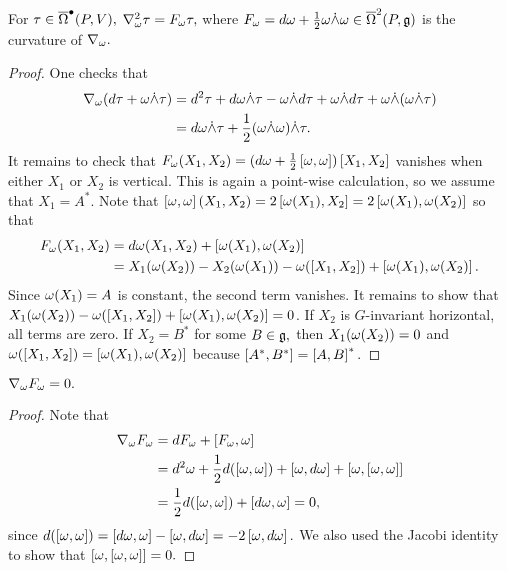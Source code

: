 \begin{prop}
 \label{JB:4.10}
For $\tau \in \overline{\Omega}^{\bullet}(P, V),$ $\nabla^{2}_{\omega}\tau=F_{\omega}\tau,$ where $F_{\omega}=d\omega + \frac{1}{2}\omega \dot{\wedge} \omega \in
\overline{\Omega}^{2}(P, \mathfrak{g})$ is the curvature of $\nabla_{\omega}.$
\end{prop}
\begin{proof}
 One checks that
\begin{align*}
 \nabla_{\omega}(d\tau+\omega \dot{\wedge} \tau)&=d^{2}\tau + d\omega \dot{\wedge} \tau - \omega \dot{\wedge} d\tau + \omega \dot{\wedge} d\tau+ \omega \dot{\wedge} (\omega \dot{\wedge}
\tau)\\
&= d\omega \dot{\wedge} \tau + \frac{1}{2}(\omega \dot{\wedge} \omega) \dot{\wedge} \tau. 
\end{align*}
It remains to check that $F_{\omega}(X_{1},X_{2})= (d\omega+\frac{1}{2}\left[\omega,\omega\right])\left[X_{1},X_{2}\right]$ vanishes when
either $X_{1}$ or $X_{2}$ is vertical. This is again a point-wise calculation, so we assume that $X_{1}=A^{*}.$ Note
that $\left[\omega,\omega\right](X_{1},X_{2})=2\left[\omega(X_{1}),X_{2}\right]=2\left[\omega(X_{1}),\omega(X_{2})\right]$ so that
\begin{align*}
 F_{\omega}(X_{1},X_{2}) &= d\omega(X_{1}, X_{2})+ \left[\omega(X_{1}),\omega(X_{2})\right] \\
&= X_{1}(\omega(X_{2}))-X_{2}(\omega(X_{1}))-\omega(\left[X_{1},X_{2}\right])+\left[\omega(X_{1}),\omega(X_{2})\right].
\end{align*}
Since $\omega(X_{1})=A$ is constant, the second term vanishes. It remains to show that
$X_{1}(\omega(X_{2}))-\omega(\left[X_{1},X_{2}\right])+\left[\omega(X_{1}),\omega(X_{2})\right]=0$. If $X_{2}$ is $G$-invariant horizontal, all
terms are zero. If $X_{2}=B^{*}$ for some $B \in \mathfrak{g},$ then $X_{1}(\omega(X_{2}))=0$ and
$\omega(\left[X_{1},X_{2}\right])=\left[\omega(X_{1}),\omega(X_{2})\right]$ because $[A^{*}, B^{*}]=\left[A,B\right]^{*}.$
\end{proof}

\begin{prop}
 \label{bianchi}
$\nabla_{\omega}F_{\omega}=0.$
\end{prop}
\begin{proof}
 Note that
\begin{align*}
 \nabla_{\omega}F_{\omega}&=dF_{\omega}+\left[F_{\omega},\omega\right] \\
&=d^{2}\omega + \frac{1}{2}d(\left[\omega,\omega\right])+\left[\omega,d\omega\right]+\left[\omega,\left[\omega,\omega\right]\right] \\
&=\frac{1}{2}d(\left[\omega,\omega\right])+\left[d\omega,\omega\right]=0,
\end{align*}
since $d(\left[\omega,\omega\right])=\left[d\omega,\omega\right]-\left[\omega,d\omega\right]=-2\left[\omega,d\omega\right].$ We also used the Jacobi identity to show
that $\left[\omega,\left[\omega,\omega\right]\right]=0.$
\end{proof}



